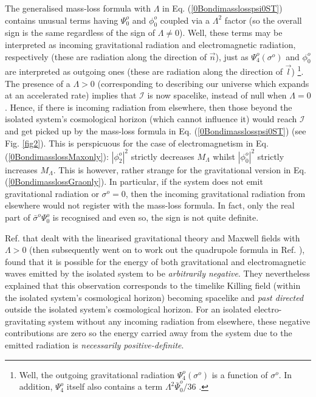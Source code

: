 \documentclass[aps,pre,preprint,superscriptaddress,showpacs,showkeys]{revtex4-1}
\begin{document}
The generalised mass-loss formula with $\Lambda$ in Eq. (\ref{0Bondimasslosspsi0ST}) contains unusual terms having $\Psi^o_0$ and $\phi^o_0$ coupled via a $\Lambda^2$ factor (so the overall sign is the same regardless of the sign of $\Lambda\neq0$). Well, these terms may be interpreted as incoming gravitational radiation and electromagnetic radiation, respectively (these are radiation along the direction of $\vec{n}$), just as $\Psi^o_4(\sigma^o)$ and $\phi^o_0$ are interpreted as outgoing ones (these are radiation along the direction of $\vec{l}$) \footnote{Well, the outgoing gravitational radiation $\Psi^o_4(\sigma^o)$ is a function of $\sigma^o$. In addition, $\Psi^o_4$ itself also contains a term $\Lambda^2\bar{\Psi}^o_0/36$ \cite{Vee2016,Vee2017}.}. The presence of a $\Lambda>0$ (corresponding to describing our universe which expands at an accelerated rate) implies that $\mathcal{I}$ is now spacelike, instead of null when $\Lambda=0$. Hence, if there is incoming radiation from elsewhere, then those beyond the isolated system's cosmological horizon (which cannot influence it) would reach $\mathcal{I}$ and get picked up by the mass-loss formula in Eq. (\ref{0Bondimasslosspsi0ST}) (see Fig. \ref{fig2}). This is perspicuous for the case of electromagnetism in Eq. (\ref{0BondimasslossMaxonly}): $|\phi^o_2|^2$ strictly decreases $M_\Lambda$ whilst $|\phi^o_0|^2$ strictly increases $M_\Lambda$. This is however, rather strange for the gravitational version in Eq. (\ref{0BondimasslossGraonly}). In particular, if the system does not emit gravitational radiation or $\sigma^o=0$, then the incoming gravitational radiation from elsewhere would not register with the mass-loss formula. In fact, only the real part of $\bar{\sigma}^o\Psi^o_0$ is recognised and even so, the sign is not quite definite.

Ref. \cite{ash2} that dealt with the linearised gravitational theory and Maxwell fields with $\Lambda>0$ (then subsequently went on to work out the quadrupole formula in Ref. \cite{ash3}), found that it is possible for the energy of both gravitational and electromagnetic waves emitted by the isolated system to be \emph{arbitrarily negative}. They nevertheless explained that this observation corresponds to the timelike Killing field (within the isolated system's cosmological horizon) becoming spacelike and \emph{past directed} outside the isolated system's cosmological horizon. For an isolated electro-gravitating system without any incoming radiation from elsewhere, these negative contributions are zero so the energy carried away from the system due to the emitted radiation is \emph{necessarily positive-definite}.
\end{document}
